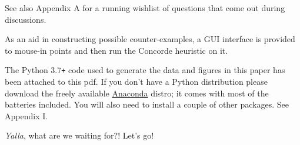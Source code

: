 \begin{description}
     See also Appendix A for a running wishlist of questions that come out during discussions. 

     As an aid in constructing possible counter-examples, a GUI interface is provided to mouse-in points and then 
     run the Concorde heuristic on it. 
     
     The Python 3.7\texttt{+} code used to generate the data and figures in this paper has been attached to this pdf. If you don't have a Python distribution 
     please download the freely available  \href{https://www.anaconda.com/products/individual}{Anaconda}  distro; it comes 
     with most of the batteries included. You will also need to install a couple of other packages. See Appendix I. 

     \textit{Yalla}, what are we waiting for?! Let’s go! 
\end{description}
